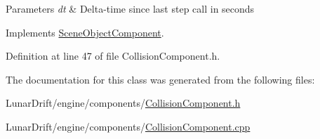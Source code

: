 \begin{DoxyParams}{Parameters}
{\em dt} & Delta-\/time since last step call in seconds \\
\hline
\end{DoxyParams}


Implements \hyperlink{class_scene_object_component_a99ebed011a6547be4d31a09927e3b810}{Scene\+Object\+Component}.



Definition at line 47 of file Collision\+Component.\+h.



The documentation for this class was generated from the following files\+:\begin{DoxyCompactItemize}
\item 
Lunar\+Drift/engine/components/\hyperlink{_collision_component_8h}{Collision\+Component.\+h}\item 
Lunar\+Drift/engine/components/\hyperlink{_collision_component_8cpp}{Collision\+Component.\+cpp}\end{DoxyCompactItemize}
